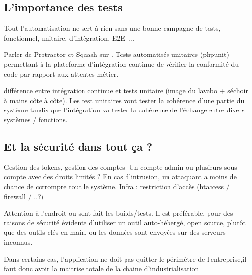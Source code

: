\subsection{L'importance des tests}

Tout l'automatisation ne sert à rien sans une bonne campagne de tests, fonctionnel, unitaire, d'intégration, E2E, ...

Parler de Protractor et Squash sur \bv. Tests automatisés unitaires (phpunit) permettant à la plateforme d'intégration continue de vérifier la conformité du code par rapport aux attentes métier.

différence entre intégration continue et tests unitaire (image du lavabo + séchoir à mains côte à côte). Les test unitaires vont tester la cohérence d'une partie du système tandis que l'intégration va tester la cohérence de l'échange entre divers systèmes / fonctions.

\subsection{Et la sécurité dans tout ça ?}

Gestion des tokens, gestion des comptes.
Un compte admin ou plusieurs sous compte avec des droits limités ? En cas d'intrusion, un attaquant a moins de chance de corrompre tout le système.
Infra : restriction d'accès (htaccess / firewall / ..?)


Attention à l'endroit ou sont fait les builds/tests. Il est préférable, pour des raisons de sécurité évidente d'utiliser un outil auto-hébergé, open source, plutôt que des outils clés en main, ou les données sont envoyées sur des serveurs inconnus. 

Dans certains cas, l'application ne doit pas quitter le périmètre de l'entreprise,il faut donc avoir la maitrise totale de la chaine d'industrialisation